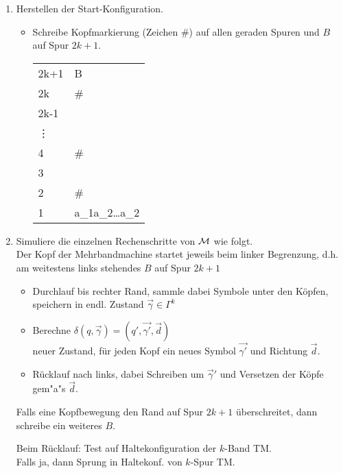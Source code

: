 \begin{Bemerkung}
	\begin{enumerate}
	 \item Herstellen der Start-Konfiguration.
	 
	 \begin{itemize}
	  \item Schreibe Kopfmarkierung (Zeichen \#) auf allen geraden Spuren und $B$ auf Spur $2k+1$.
	  
	  	\begin{tabular}{*2{M{l}}}
		2k+1 & \blank B \blank\\
		2k & \#\\
		2k-1 & \blank\\
		\vdots\\
		4 & \#\\
		3 & \blank\\
		2 & \#\\
		1 & a_1a_2\dots a_2
	\end{tabular} 
	 \end{itemize}
	 
    \item Simuliere die einzelnen Rechenschritte von $\mathcal{M}$ wie folgt.\\
	Der Kopf der Mehrbandmachine startet jeweils beim linker Begrenzung, d.h. am weitestens links stehendes $B$ auf Spur $2k+1$
	\begin{itemize}
		\item Durchlauf bis rechter Rand, sammle dabei Symbole unter den Köpfen, speichern in endl. Zustand $\overrightarrow{\gamma} \in \Gamma^k$
		\item Berechne $\delta(q,\overrightarrow{\gamma})=(q',\overrightarrow{\gamma'},\overrightarrow{d})$\\
		neuer Zustand, für jeden Kopf ein neues Symbol $\overrightarrow{\gamma'}$ und Richtung $\overrightarrow{d}$.
		\item Rücklauf nach links, dabei Schreiben um $\overrightarrow{\gamma}'$ und Versetzen der Köpfe gem"a"s $\overrightarrow{d}$.
	\end{itemize}
	Falls eine Kopfbewegung den Rand auf Spur $2k+1$ überschreitet, dann schreibe ein weiteres $B$.
	
	Beim Rücklauf: Test auf Haltekonfiguration der $k$-Band \ac{TM}.\\
	Falls ja, dann Sprung in Haltekonf. von $k$-Spur TM.
% 	
% 
	\end{enumerate}

\end{Bemerkung}


